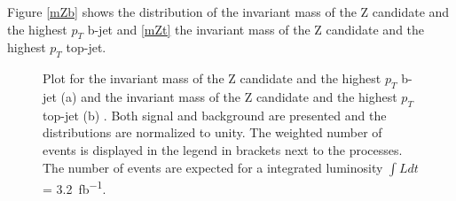 Figure \ref{mZb} shows the distribution of the invariant mass of the Z candidate and the highest $p_{T}$ b-jet and \ref{mZt} the invariant mass of the Z candidate and the highest $p_{T}$ top-jet.


\begin{figure}[h]
    \centering
    \caption{Plot for the invariant mass of the Z candidate and the highest $p_{T}$ b-jet (a) and the invariant mass of the Z candidate and the highest $p_{T}$ top-jet (b)  . 
Both signal and background are presented and the distributions are normalized to unity. 
The weighted number of events is displayed in the legend in brackets next to the processes. 
The number of events are expected for a integrated luminosity $\int L dt$ = \SI{3.2}{fb^{-1}}.}
    \label{fig::stop}   
\end{figure}
